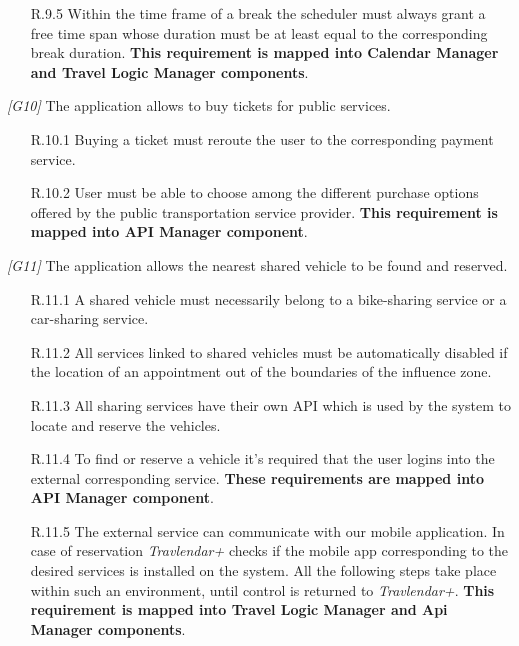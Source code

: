 \begin{description}
\begin{itemize}
			\item[R.9.5] Within the time frame of a break the scheduler must always grant a free time span whose duration must be at least equal to the corresponding break duration.
			\textbf{This requirement is mapped into Calendar Manager and Travel Logic Manager components}.
		\end{itemize}


	\item \textit{[G10]} The application allows to buy tickets for public services.
		\begin{itemize}
			\item[R.10.1] Buying a ticket must reroute the user to the corresponding payment service.

			\item[R.10.2] User must be able to choose among the different purchase options offered by the public transportation service provider.
			\textbf{This requirement is mapped into API Manager component}.
		\end{itemize}


	\item \textit{[G11]} The application allows the nearest shared vehicle to be found and reserved.
		\begin{itemize}
			\item [R.11.1] A shared vehicle must necessarily belong to a bike-sharing service or a car-sharing service.

			\item [R.11.2] All services linked to shared vehicles must be automatically disabled if the location of an appointment out of the boundaries of the influence zone.

			\item [R.11.3] All sharing services have their own API which is used by the system to locate and reserve the vehicles.

			\item [R.11.4] To find or reserve a vehicle it's required that the user logins into the external corresponding service.
			\textbf{These requirements are mapped into API Manager component}.

			\item [R.11.5] The external service can communicate with our mobile application. In case of reservation \textit{Travlendar+} checks if the mobile app corresponding to the desired services is installed on the system. All the following steps take place within such an environment, until control is returned to \textit{Travlendar+}.			
			\textbf{This requirement is mapped into Travel Logic Manager and Api Manager components}.


\end{itemize}
\end{description}

